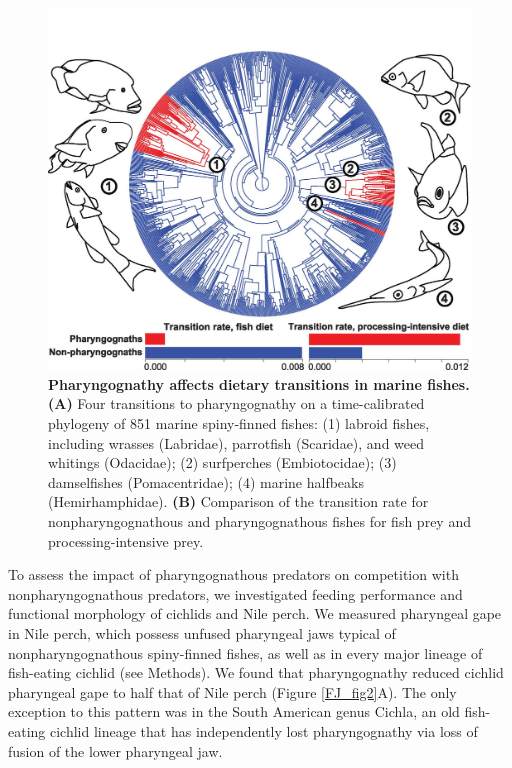 \begin{figure}
    \centering
    \includegraphics[width=\textwidth]{FishJaws/figures/fig1}
    \caption{\textbf{Pharyngognathy affects dietary transitions in marine fishes.} \textbf{(A)} Four transitions to pharyngognathy on a time-calibrated phylogeny of 851 marine spiny-finned fishes: (1) labroid fishes, including wrasses (Labridae), parrotfish (Scaridae), and weed whitings (Odacidae); (2) surfperches (Embiotocidae); (3) damselfishes (Pomacentridae); (4) marine halfbeaks (Hemirhamphidae). \textbf{(B)} Comparison of the transition rate for nonpharyngognathous and pharyngognathous fishes for fish prey and processing-intensive prey.}
    \label{FJ_fig1}
\end{figure}

To assess the impact of pharyngognathous predators on competition with nonpharyngognathous predators, we investigated feeding performance and functional morphology of cichlids and Nile perch. We measured pharyngeal gape in Nile perch, which possess unfused pharyngeal jaws typical of nonpharyngognathous spiny-finned fishes, as well as in every major lineage of fish-eating cichlid (see Methods). We found that pharyngognathy reduced cichlid pharyngeal gape to half that of Nile perch (Figure \ref{FJ_fig2}A). The only exception to this pattern was in the South American genus Cichla, an old fish-eating cichlid lineage that has independently lost pharyngognathy via loss of fusion of the lower pharyngeal jaw.

